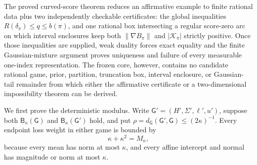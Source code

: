 The proved curved-score theorem reduces an affirmative example to finite rational data plus two independently checkable certificates: the global inequalities \(R(\delta_{\pi})\leq q\leq b(\pi)\), and one rational box intersecting a regular score-zero arc on which interval enclosures keep both \(\|\nabla B_{\pi}\|\) and \(|\mathcal K_{\pi}|\) strictly positive. Once those inequalities are supplied, weak duality forces exact equality and the finite Gaussian-mixture argument proves uniqueness and failure of every measurable one-index representation. The frozen core, however, contains no candidate rational game, prior, partition, truncation box, interval enclosure, or Gaussian-tail remainder from which either the affirmative certificate or a two-dimensional impossibility theorem can be derived.

We first prove the deterministic modulus. Write \(\mathsf G'=(H',\Sigma',\ell',u')\), suppose both \(\mathsf B_{\kappa}(\mathsf G)\) and \(\mathsf B_{\kappa}(\mathsf G')\) hold, and put \(\rho=d_{\mathsf G}(\mathsf G',\mathsf G)\leq(2\kappa)^{-1}\). Every endpoint loss weight in either game is bounded by
\[
 \kappa+\kappa^2=M_{\kappa}, \tag{1}
\]
because every mean has norm at most \(\kappa\), and every affine intercept and normal has magnitude or norm at most \(\kappa\).

